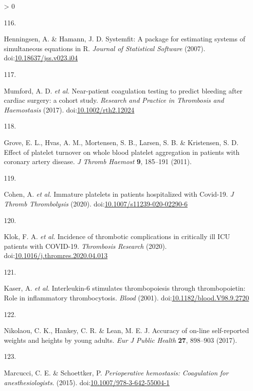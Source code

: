 \documentclass[11pt,twoside]{bristolthesis}
\newlength{\cslhangindent}
\newlength{\csllabelwidth}
\newenvironment{CSLReferences}[2] %
 {%
  \setlength{\parindent}{0pt}
  \ifodd #1 \everypar{\setlength{\hangindent}{\cslhangindent}}\ignorespaces\fi
  \ifnum #2 > 0
  \setlength{\parskip}{#2\baselineskip}
  \fi
 }%
 {}
\newcommand{\CSLLeftMargin}[1]{\parbox[t]{\csllabelwidth}{#1}}
\newcommand{\CSLRightInline}[1]{\parbox[t]{\linewidth - \csllabelwidth}{#1}\break}
\begin{document}
\begin{CSLReferences}{0}{0}
\leavevmode\hypertarget{ref-Henningsen2007}{}%
\CSLLeftMargin{116. }
\CSLRightInline{Henningsen, A. \& Hamann, J. D. {Systemfit: A package for estimating systems of simultaneous equations in R}. \emph{Journal of Statistical Software} (2007). doi:\href{https://doi.org/10.18637/jss.v023.i04}{10.18637/jss.v023.i04}}

\leavevmode\hypertarget{ref-Mumford2017}{}%
\CSLLeftMargin{117. }
\CSLRightInline{Mumford, A. D. \emph{et al.} {Near-patient coagulation testing to predict bleeding after cardiac surgery: a cohort study}. \emph{Research and Practice in Thrombosis and Haemostasis} (2017). doi:\href{https://doi.org/10.1002/rth2.12024}{10.1002/rth2.12024}}

\leavevmode\hypertarget{ref-Grove2011a}{}%
\CSLLeftMargin{118. }
\CSLRightInline{Grove, E. L., Hvas, A. M., Mortensen, S. B., Larsen, S. B. \& Kristensen, S. D. {Effect of platelet turnover on whole blood platelet aggregation in patients with coronary artery disease}. \emph{J Thromb Haemost} \textbf{9}, 185--191 (2011).}

\leavevmode\hypertarget{ref-Cohen2020}{}%
\CSLLeftMargin{119. }
\CSLRightInline{Cohen, A. \emph{et al.} {Immature platelets in patients hospitalized with Covid-19}. \emph{J Thromb Thrombolysis} (2020). doi:\href{https://doi.org/10.1007/s11239-020-02290-6}{10.1007/s11239-020-02290-6}}

\leavevmode\hypertarget{ref-Klok2020}{}%
\CSLLeftMargin{120. }
\CSLRightInline{Klok, F. A. \emph{et al.} {Incidence of thrombotic complications in critically ill ICU patients with COVID-19}. \emph{Thrombosis Research} (2020). doi:\href{https://doi.org/10.1016/j.thromres.2020.04.013}{10.1016/j.thromres.2020.04.013}}

\leavevmode\hypertarget{ref-Kaser2001}{}%
\CSLLeftMargin{121. }
\CSLRightInline{Kaser, A. \emph{et al.} {Interleukin-6 stimulates thrombopoiesis through thrombopoietin: Role in inflammatory thrombocytosis}. \emph{Blood} (2001). doi:\href{https://doi.org/10.1182/blood.V98.9.2720}{10.1182/blood.V98.9.2720}}

\leavevmode\hypertarget{ref-Nikolaou2017}{}%
\CSLLeftMargin{122. }
\CSLRightInline{Nikolaou, C. K., Hankey, C. R. \& Lean, M. E. J. {Accuracy of on-line self-reported weights and heights by young adults}. \emph{Eur J Public Health} \textbf{27}, 898--903 (2017).}

\leavevmode\hypertarget{ref-Marcucci2015}{}%
\CSLLeftMargin{123. }
\CSLRightInline{Marcucci, C. E. \& Schoettker, P. \emph{{Perioperative hemostasis: Coagulation for anesthesiologists}}. (2015). doi:\href{https://doi.org/10.1007/978-3-642-55004-1}{10.1007/978-3-642-55004-1}}


\end{CSLReferences}
\end{document}
